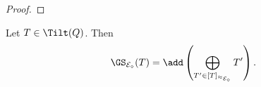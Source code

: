 \begin{proof}
\end{proof}



\begin{theorem}
\label{th:Treaching}
Let $T \in \Tilt(Q)$. Then \[\GS_{\mathcal{E}_\diamond}(T) = \add\left(\bigoplus_{T' \in [T]_{\approx_{\mathcal{E}_\diamond}}} T' \right).\]
\end{theorem}

